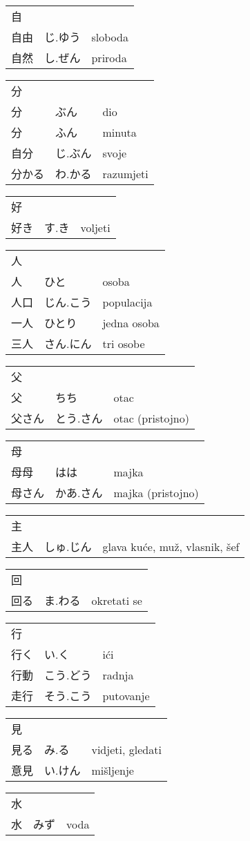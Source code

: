 

\newenvironment{dictentry}[1]{
	\begin{tabular}{p{2cm} p{3cm} p{10cm}}
		#1 &&\\
}{
	\end{tabular}
	\vspace{20pt}
}

\newcommand{\example}[3]{
	\hspace*{\fill}#1 & #2 & #3\\
}

\author{ロボット君}


\begin{dictentry}{自}
\example{自由}{じ.ゆう}{sloboda}
\example{自然}{し.ぜん}{priroda}
\end{dictentry}

\begin{dictentry}{分}
\example{分}{ぶん}{dio}
\example{分}{ふん}{minuta}
\example{自分}{じ.ぶん}{svoje}
\example{分かる}{わ.かる}{razumjeti}
\end{dictentry}

\begin{dictentry}{好}
\example{好き}{す.き}{voljeti}
\end{dictentry}

\begin{dictentry}{人}
\example{人}{ひと}{osoba}
\example{人口}{じん.こう}{populacija}
\example{一人}{ひとり}{jedna osoba}
\example{三人}{さん.にん}{tri osobe}
\end{dictentry}

\begin{dictentry}{父}
\example{父}{ちち}{otac}
\example{父さん}{とう.さん}{otac (pristojno)}
\end{dictentry}

\begin{dictentry}{母}
\example{母母}{はは}{majka}
\example{母さん}{かあ.さん}{majka (pristojno)}
\end{dictentry}

\begin{dictentry}{主}
\example{主人}{しゅ.じん}{glava kuće, muž, vlasnik, šef}
\end{dictentry}

\begin{dictentry}{回}
\example{回る}{ま.わる}{okretati se}
\end{dictentry}

\begin{dictentry}{行}
\example{行く}{い.く}{ići}
\example{行動}{こう.どう}{radnja}
\example{走行}{そう.こう}{putovanje}
\end{dictentry}

\begin{dictentry}{見}
\example{見る}{み.る}{vidjeti, gledati}
\example{意見}{い.けん}{mišljenje}
\end{dictentry}

\begin{dictentry}{水}
\example{水}{みず}{voda}
\end{dictentry}

